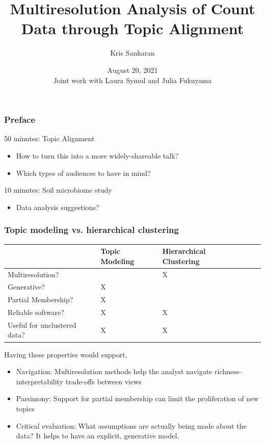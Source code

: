 \documentclass[hyperref={colorlinks=true, linkcolor=violet, citecolor=SeaGreen}]{beamer}
\title{Multiresolution Analysis of Count Data through Topic Alignment}
\author{Kris Sankaran}
\date{August 20, 2021 \\ \small{Joint work with Laura Symul and Julia Fukuyama}}
\begin{document}
\frame{\titlepage}

\begin{frame}
  \frametitle{Preface}

  50 minutes: Topic Alignment
  \begin{itemize}
    \item How to turn this into a more widely-shareable talk?
    \item Which types of audiences to have in mind?
  \end{itemize}

  10 minutes: Soil microbiome study
  \begin{itemize}
  \item Data analysis suggestions?
  \end{itemize}
\end{frame}

\begin{frame}
  \frametitle{Topic modeling vs. hierarchical clustering}
  \begin{tabularx}{.9\textwidth}{|l|X|X|X|r}
  \hline
  & Topic Modeling & Hierarchical Clustering \\ \hline
  Multiresolution?    &   & X  \\ \hline
  Generative?        & X   &   \\ \hline
  Partial Membership? & X  &    \\ \hline
  Reliable software? & X & X  \\ \hline
  Useful for unclustered data? & X & X \\ \hline
  \end{tabularx}
\end{frame}

\begin{frame}
  Having these properties would support,
  \begin{itemize}
  \item Navigation: Multiresolution methods help the analyst navigate
  richness-interpretability trade-offs between views
  \item Parsimony: Support for partial membership can limit the proliferation of
  new topics
  \item Critical evaluation: What assumptions are actually being made about
  the data? It helps to have an explicit, generative model.
\end{itemize}
\end{frame}
\end{document}
